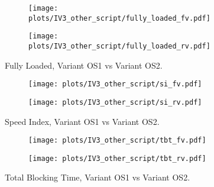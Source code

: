 \begin{figure}
	\centering
	\begin{subfigure}{.5\textwidth}
		\centering
		\texttt{[image: plots/IV3\_other\_script/fully\_loaded\_fv.pdf]}
		\label{fig:sub1}
	\end{subfigure}%
	\begin{subfigure}{.5\textwidth}
		\centering
		\texttt{[image: plots/IV3\_other\_script/fully\_loaded\_rv.pdf]}
		\label{fig:sub2}
	\end{subfigure}
	\caption{Fully Loaded, Variant OS1 vs Variant OS2.}
	\label{figure:plt_original_test}
\end{figure}


\begin{figure}
	\centering
	\begin{subfigure}{.5\textwidth}
		\centering
		\texttt{[image: plots/IV3\_other\_script/si\_fv.pdf]}
		\label{fig:sub1}
	\end{subfigure}%
	\begin{subfigure}{.5\textwidth}
		\centering
		\texttt{[image: plots/IV3\_other\_script/si\_rv.pdf]}
		\label{fig:sub2}
	\end{subfigure}
	\caption{Speed Index, Variant OS1 vs Variant OS2.}
	\label{figure:plt_original_test}
\end{figure}


\begin{figure}
	\centering
	\begin{subfigure}{.5\textwidth}
		\centering
		\texttt{[image: plots/IV3\_other\_script/tbt\_fv.pdf]}
		\label{fig:sub1}
	\end{subfigure}%
	\begin{subfigure}{.5\textwidth}
		\centering
		\texttt{[image: plots/IV3\_other\_script/tbt\_rv.pdf]}
		\label{fig:sub2}
	\end{subfigure}
	\caption{Total Blocking Time, Variant OS1 vs Variant OS2.}
	\label{figure:plt_original_test}
\end{figure}















